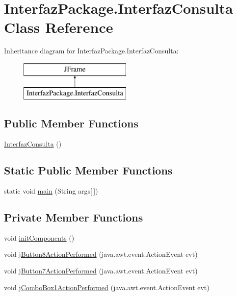 \hypertarget{class_interfaz_package_1_1_interfaz_consulta}{}\section{Interfaz\+Package.\+Interfaz\+Consulta Class Reference}
\label{class_interfaz_package_1_1_interfaz_consulta}
Inheritance diagram for Interfaz\+Package.\+Interfaz\+Consulta\+:\begin{figure}[H]
\begin{center}
\leavevmode
\includegraphics[height=2.000000cm]{class_interfaz_package_1_1_interfaz_consulta}
\end{center}
\end{figure}
\subsection*{Public Member Functions}
\begin{DoxyCompactItemize}
\item 
\mbox{\hyperlink{class_interfaz_package_1_1_interfaz_consulta_a58097671d4b2680db3ec600ad744ebd9}{Interfaz\+Consulta}} ()
\end{DoxyCompactItemize}
\subsection*{Static Public Member Functions}
\begin{DoxyCompactItemize}
\item 
static void \mbox{\hyperlink{class_interfaz_package_1_1_interfaz_consulta_a8d2a8ac33a962434617daf40c394da2d}{main}} (String args\mbox{[}$\,$\mbox{]})
\end{DoxyCompactItemize}
\subsection*{Private Member Functions}
\begin{DoxyCompactItemize}
\item 
void \mbox{\hyperlink{class_interfaz_package_1_1_interfaz_consulta_a18ee0dacb0079aa269b82f998af3db37}{init\+Components}} ()
\item 
void \mbox{\hyperlink{class_interfaz_package_1_1_interfaz_consulta_a71dca5baea9a79d982001c3407d35e79}{j\+Button8\+Action\+Performed}} (java.\+awt.\+event.\+Action\+Event evt)
\item 
void \mbox{\hyperlink{class_interfaz_package_1_1_interfaz_consulta_abd82ed50489881b74e9832dfdd4e82a1}{j\+Button7\+Action\+Performed}} (java.\+awt.\+event.\+Action\+Event evt)
\item 
void \mbox{\hyperlink{class_interfaz_package_1_1_interfaz_consulta_a72feab888bad4cca4bf15c1186d400a1}{j\+Combo\+Box1\+Action\+Performed}} (java.\+awt.\+event.\+Action\+Event evt)
\end{DoxyCompactItemize}
